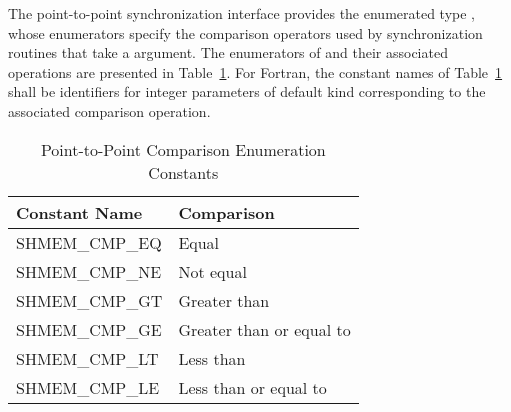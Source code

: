 The point-to-point synchronization interface provides the enumerated type
, whose enumerators specify the comparison operators used
by synchronization routines that take a  argument. The
enumerators of  and their associated operations are
presented in Table~\ref{p2p-consts}.  For Fortran, the constant names of
Table~\ref{p2p-consts} shall be identifiers for integer parameters of
default kind corresponding to the associated comparison operation.

\begin{table}[h]
  \begin{center}
    \begin{tabular}{ll}
      \hline
      Constant Name    & Comparison               \\ \hline
      SHMEM\_CMP\_EQ   & Equal                    \\
      SHMEM\_CMP\_NE   & Not equal                \\
      SHMEM\_CMP\_GT   & Greater than             \\
      SHMEM\_CMP\_GE   & Greater than or equal to \\
      SHMEM\_CMP\_LT   & Less than                \\
      SHMEM\_CMP\_LE   & Less than or equal to    \\ \hline
    \end{tabular}
    \caption{Point-to-Point Comparison Enumeration Constants}
    \label{p2p-consts}
  \end{center}
\end{table}
